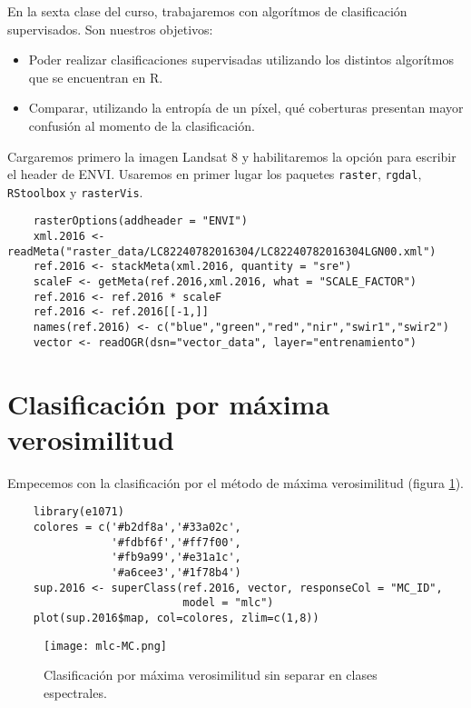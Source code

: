 En la sexta clase del curso, trabajaremos con algor\'itmos de clasificaci\'on  supervisados. Son nuestros objetivos:

\begin{itemize}
  \item Poder realizar clasificaciones supervisadas utilizando los distintos algor\'itmos que se encuentran en R.
  \item Comparar, utilizando la entrop\'ia de un p\'ixel, qu\'e coberturas presentan  mayor confusi\'on al momento de la clasificaci\'on.
\end{itemize}

Cargaremos primero la imagen Landsat 8 y habilitaremos la opci\'on para escribir el header de ENVI\@. Usaremos en primer lugar los paquetes \texttt{raster}, \texttt{rgdal}, \texttt{RStoolbox} y \texttt{rasterVis}.

\begin{lstlisting}
    rasterOptions(addheader = "ENVI")
    xml.2016 <- readMeta("raster_data/LC82240782016304/LC82240782016304LGN00.xml")
    ref.2016 <- stackMeta(xml.2016, quantity = "sre")
    scaleF <- getMeta(ref.2016,xml.2016, what = "SCALE_FACTOR")
    ref.2016 <- ref.2016 * scaleF
    ref.2016 <- ref.2016[[-1,]]
    names(ref.2016) <- c("blue","green","red","nir","swir1","swir2")
    vector <- readOGR(dsn="vector_data", layer="entrenamiento")
\end{lstlisting}

\section{Clasificaci\'on por m\'axima verosimilitud}

Empecemos con la clasificaci\'on por el m\'etodo de m\'axima verosimilitud (figura \ref{fig:MC}).

\begin{lstlisting}
    library(e1071)
    colores = c('#b2df8a','#33a02c',
                '#fdbf6f','#ff7f00',
                '#fb9a99','#e31a1c',
                '#a6cee3','#1f78b4')
    sup.2016 <- superClass(ref.2016, vector, responseCol = "MC_ID",
                           model = "mlc")
    plot(sup.2016$map, col=colores, zlim=c(1,8))
\end{lstlisting}

\begin{figure}[h!]
  \centering
  \texttt{[image: mlc-MC.png]}
  \caption{Clasificaci\'on por m\'axima verosimilitud sin separar en clases espectrales.}
  \label{fig:MC}
\end{figure}

